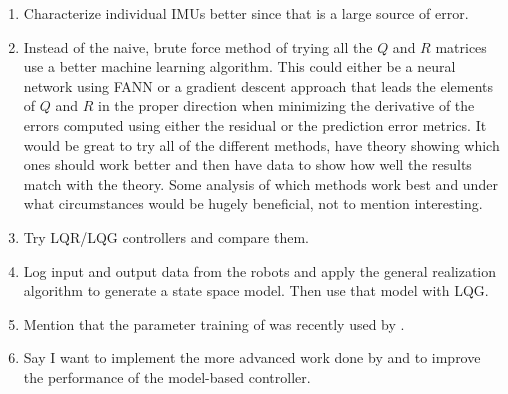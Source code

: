 \begin{enumerate}
\item Characterize individual IMUs better since that is a large source of error.
\item Instead of the naive, brute force method of trying all the $Q$ and $R$ matrices use a better machine learning algorithm. This could either be a neural network using FANN or a gradient descent approach that leads the elements of $Q$ and $R$ in the proper direction when minimizing the derivative of the errors computed using either the residual or the prediction error metrics. It would be great to try all of the different methods, have theory showing which ones should work better and then have data to show how well the results match with the theory. Some analysis of which methods work best and under what circumstances would be hugely beneficial, not to mention interesting.
\item Try LQR/LQG controllers and compare them.
\item Log input and output data from the robots and apply the general realization algorithm \cite{deCallafonGRA08} to generate a state space model. Then use that model with LQG.
\item Mention that the parameter training of \cite{Abbeel-RSS-05} was recently used by \cite{SakaiKuroda10}.
\item Say I want to implement the more advanced work done by \cite{Gulati08} and \cite{Lapierre06} to improve the performance of the model-based controller.
\end{enumerate}
